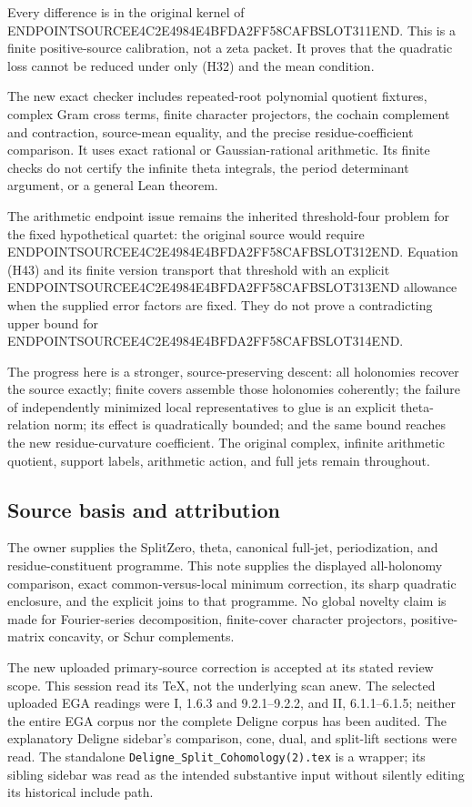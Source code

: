 Every difference is in the original kernel of ENDPOINTSOURCEE4C2E4984E4BFDA2FF58CAFBSLOT311END. This is a finite positive-source calibration, not a zeta packet. It proves that the quadratic loss cannot be reduced under only (H32) and the mean condition.

The new exact checker includes repeated-root polynomial quotient fixtures, complex Gram cross terms, finite character projectors, the cochain complement and contraction, source-mean equality, and the precise residue-coefficient comparison. It uses exact rational or Gaussian-rational arithmetic. Its finite checks do not certify the infinite theta integrals, the period determinant argument, or a general Lean theorem.

The arithmetic endpoint issue remains the inherited threshold-four problem for the fixed hypothetical quartet: the original source would require ENDPOINTSOURCEE4C2E4984E4BFDA2FF58CAFBSLOT312END. Equation (H43) and its finite version transport that threshold with an explicit ENDPOINTSOURCEE4C2E4984E4BFDA2FF58CAFBSLOT313END allowance when the supplied error factors are fixed. They do not prove a contradicting upper bound for ENDPOINTSOURCEE4C2E4984E4BFDA2FF58CAFBSLOT314END.

The progress here is a stronger, source-preserving descent: all holonomies recover the source exactly; finite covers assemble those holonomies coherently; the failure of independently minimized local representatives to glue is an explicit theta-relation norm; its effect is quadratically bounded; and the same bound reaches the new residue-curvature coefficient. The original complex, infinite arithmetic quotient, support labels, arithmetic action, and full jets remain throughout.

\subsection{Source basis and attribution}\label{endpoint-holonomy_original--source-basis-and-attribution}

The owner supplies the SplitZero, theta, canonical full-jet, periodization, and residue-constituent programme. This note supplies the displayed all-holonomy comparison, exact common-versus-local minimum correction, its sharp quadratic enclosure, and the explicit joins to that programme. No global novelty claim is made for Fourier-series decomposition, finite-cover character projectors, positive-matrix concavity, or Schur complements.

The new uploaded primary-source correction is accepted at its stated review scope. This session read its TeX, not the underlying scan anew. The selected uploaded EGA readings were I, 1.6.3 and 9.2.1--9.2.2, and II, 6.1.1--6.1.5; neither the entire EGA corpus nor the complete Deligne corpus has been audited. The explanatory Deligne sidebar's comparison, cone, dual, and split-lift sections were read. The standalone \texttt{Deligne\_Split\_Cohomology(2).tex} is a wrapper; its sibling sidebar was read as the intended substantive input without silently editing its historical include path.

